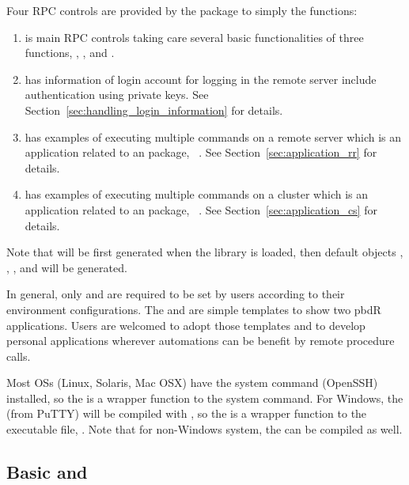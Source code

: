Four RPC controls are provided by the package to simply the functions:
\begin{enumerate}
\item {} is main RPC controls taking care several basic
      functionalities of three functions, , , and
      .
\item {} has information of login account for logging in
      the remote server include authentication using private keys.
      See Section~\ref{sec:handling_login_information} for details.
\item {} has examples of executing multiple commands
      on a remote server which is an application related
      to an  package, ~\citep{remoter}. See
      Section~\ref{sec:application_rr} for details.
\item {} has examples of executing multiple commands
      on a  cluster which is an application related
      to an  package, ~\citep{pbdCS}. See
      Section~\ref{sec:application_cs} for details.
\end{enumerate}
Note that  will be first generated when the library 
is loaded, then default objects , , ,
and  will be generated.

In general, only  and  are required to be 
set by users according to their environment configurations.
The  and  are simple templates to show two
pbdR applications. Users are welcomed to adopt those templates and to
develop personal applications wherever automations can be benefit
by remote procedure calls.

Most OSs (Linux, Solaris, Mac OSX) have the system command  (OpenSSH)
installed, so the
 is a wrapper function to the system  command.
For Windows, the  (from PuTTY) will be compiled with
, so the  is a wrapper function to the
executable file, .
Note that for non-Windows system, the  can be compiled as well.


\subsection[Basic \code{ssh} and \code{rpc()}]{Basic  and }
\label{sec:basic_rpc}

